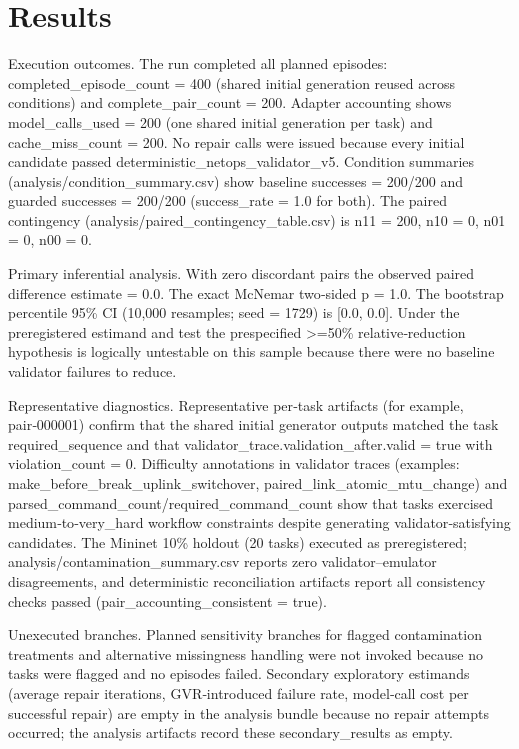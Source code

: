 \documentclass[conference]{IEEEtran}
\begin{document}
\section{Results}
Execution outcomes. The run completed all planned episodes: completed\_episode\_count = 400 (shared initial generation reused across conditions) and complete\_pair\_count = 200. Adapter accounting shows model\_calls\_used = 200 (one shared initial generation per task) and cache\_miss\_count = 200. No repair calls were issued because every initial candidate passed deterministic\_netops\_validator\_v5. Condition summaries (analysis/condition\_summary.csv) show baseline successes = 200/200 and guarded successes = 200/200 (success\_rate = 1.0 for both). The paired contingency (analysis/paired\_contingency\_table.csv) is n11 = 200, n10 = 0, n01 = 0, n00 = 0.

Primary inferential analysis. With zero discordant pairs the observed paired difference estimate = 0.0. The exact McNemar two‑sided p = 1.0. The bootstrap percentile 95\% CI (10,000 resamples; seed = 1729) is [0.0, 0.0]. Under the preregistered estimand and test the prespecified >=50\% relative‑reduction hypothesis is logically untestable on this sample because there were no baseline validator failures to reduce.

Representative diagnostics. Representative per‑task artifacts (for example, pair‑000001) confirm that the shared initial generator outputs matched the task required\_sequence and that validator\_trace.validation\_after.valid = true with violation\_count = 0. Difficulty annotations in validator traces (examples: make\_before\_break\_uplink\_switchover, paired\_link\_atomic\_mtu\_change) and parsed\_command\_count/required\_command\_count show that tasks exercised medium‑to‑very\_hard workflow constraints despite generating validator‑satisfying candidates. The Mininet 10\% holdout (20 tasks) executed as preregistered; analysis/contamination\_summary.csv reports zero validator--emulator disagreements, and deterministic reconciliation artifacts report all consistency checks passed (pair\_accounting\_consistent = true).

Unexecuted branches. Planned sensitivity branches for flagged contamination treatments and alternative missingness handling were not invoked because no tasks were flagged and no episodes failed. Secondary exploratory estimands (average repair iterations, GVR‑introduced failure rate, model‑call cost per successful repair) are empty in the analysis bundle because no repair attempts occurred; the analysis artifacts record these secondary\_results as empty.
\end{document}
